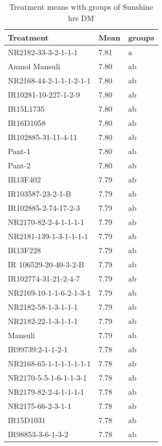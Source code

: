 \documentclass[]{article}
\begin{document}
\begin{longtable}{lll}
\caption{\label{tab:two-fac-groups-tab-agroclimate-normal}Treatment means with groups of Sunshine hrs DM}\\
\toprule
Treatment & Mean & groups\\
\midrule
\rowcolor{gray!6}  NR2182-33-3-2-1-1-1 & 7.81 & a\\
Anmol Mansuli & 7.80 & ab\\
\rowcolor{gray!6}  NR2168-44-2-1-1-1-2-1-1 & 7.80 & ab\\
IR10281-10-227-1-2-9 & 7.80 & ab\\
\rowcolor{gray!6}  IR15L1735 & 7.80 & ab\\
\addlinespace
IR16D1058 & 7.80 & ab\\
\rowcolor{gray!6}  IR102885-31-11-4-11 & 7.80 & ab\\
Pant-1 & 7.80 & ab\\
\rowcolor{gray!6}  Pant-2 & 7.80 & ab\\
IR13F402 & 7.79 & ab\\
\addlinespace
\rowcolor{gray!6}  IR103587-23-2-1-B & 7.79 & ab\\
IR102885-2-74-17-2-3 & 7.79 & ab\\
\rowcolor{gray!6}  NR2170-82-2-4-1-1-1-1 & 7.79 & ab\\
NR2181-139-1-3-1-1-1-1 & 7.79 & ab\\
\rowcolor{gray!6}  IR13F228 & 7.79 & ab\\
\addlinespace
IR 106529-20-40-3-2-B & 7.79 & ab\\
\rowcolor{gray!6}  IR102774-31-21-2-4-7 & 7.79 & ab\\
NR2169-10-1-1-6-2-1-3-1 & 7.79 & ab\\
\rowcolor{gray!6}  NR2182-58-1-3-1-1-1 & 7.79 & ab\\
NR2182-22-1-3-1-1-1 & 7.79 & ab\\
\addlinespace
\rowcolor{gray!6}  Mansuli & 7.79 & ab\\
IR99739:2-1-1-2-1 & 7.78 & ab\\
\rowcolor{gray!6}  NR2168-65-1-1-1-1-1-1-1 & 7.78 & ab\\
NR2170-5-5-1-6-1-1-3-1 & 7.78 & ab\\
\rowcolor{gray!6}  NR2179-82-2-4-1-1-1-1 & 7.78 & ab\\
\addlinespace
NR2175-66-2-3-1-1 & 7.78 & ab\\
\rowcolor{gray!6}  IR15D1031 & 7.78 & ab\\
IR98853-3-6-1-3-2 & 7.78 & ab\\

\end{longtable}
\end{document}
